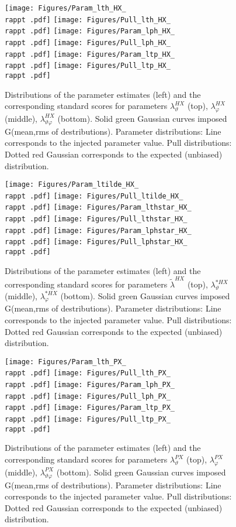 \documentclass[12pt]{article}
\newcommand{\lamthHX}{\lambda^{\scriptscriptstyle HX}_\vartheta}
\newcommand{\lamphHX}{\lambda^{\scriptscriptstyle HX}_\varphi}
\newcommand{\lamthphHX}{\lambda^{\scriptscriptstyle HX}_{\vartheta \varphi}}
\newcommand{\lamtildeHX}{\tilde{\lambda}^{\scriptscriptstyle HX}}
\newcommand{\lamthstarHX}{\lambda^{* \scriptscriptstyle HX}_\vartheta}
\newcommand{\lamphstarHX}{\lambda^{* \scriptscriptstyle HX}_\varphi}
\newcommand{\lamthPX}{\lambda^{\scriptscriptstyle PX}_\vartheta}
\newcommand{\lamphPX}{\lambda^{\scriptscriptstyle PX}_\varphi}
\newcommand{\lamthphPX}{\lambda^{\scriptscriptstyle PX}_{\vartheta \varphi}}
\providecommand{\rappt}[1]{rap1pt1}%
\begin{document}
\begin{figure}[htbp]
\centering
\texttt{[image: Figures/Param\_lth\_HX\_\\rappt .pdf]}
\texttt{[image: Figures/Pull\_lth\_HX\_\\rappt .pdf]}
\texttt{[image: Figures/Param\_lph\_HX\_\\rappt .pdf]}
\texttt{[image: Figures/Pull\_lph\_HX\_\\rappt .pdf]}
\texttt{[image: Figures/Param\_ltp\_HX\_\\rappt .pdf]}
\texttt{[image: Figures/Pull\_ltp\_HX\_\\rappt .pdf]}
\caption{Distributions of the parameter estimates (left) and the corresponding
standard scores for parameters $\lamthHX$ (top), $\lamphHX$ (middle),
$\lamthphHX$ (bottom). Solid green Gaussian curves imposed G(mean,rms of
destributions). Parameter distributions: Line corresponds to the injected parameter value.
Pull distributions: Dotted red Gaussian corresponds to the expected
(unbiased) distribution.}
\end{figure}
\clearpage

\begin{figure}[htbp]
\centering
\texttt{[image: Figures/Param\_ltilde\_HX\_\\rappt .pdf]}
\texttt{[image: Figures/Pull\_ltilde\_HX\_\\rappt .pdf]}
\texttt{[image: Figures/Param\_lthstar\_HX\_\\rappt .pdf]}
\texttt{[image: Figures/Pull\_lthstar\_HX\_\\rappt .pdf]}
\texttt{[image: Figures/Param\_lphstar\_HX\_\\rappt .pdf]}
\texttt{[image: Figures/Pull\_lphstar\_HX\_\\rappt .pdf]}
\caption{Distributions of the parameter estimates (left) and the corresponding
standard scores for parameters $\lamtildeHX$ (top), $\lamthstarHX$ (middle),
$\lamphstarHX$ (bottom). Solid green Gaussian curves imposed G(mean,rms of
destributions). Parameter distributions: Line corresponds to the injected parameter value.
Pull distributions: Dotted red Gaussian corresponds to the expected
(unbiased) distribution.}
\end{figure}
\clearpage









\begin{figure}[htbp]
\centering
\texttt{[image: Figures/Param\_lth\_PX\_\\rappt .pdf]}
\texttt{[image: Figures/Pull\_lth\_PX\_\\rappt .pdf]}
\texttt{[image: Figures/Param\_lph\_PX\_\\rappt .pdf]}
\texttt{[image: Figures/Pull\_lph\_PX\_\\rappt .pdf]}
\texttt{[image: Figures/Param\_ltp\_PX\_\\rappt .pdf]}
\texttt{[image: Figures/Pull\_ltp\_PX\_\\rappt .pdf]}
\caption{Distributions of the parameter estimates (left) and the corresponding
standard scores for parameters $\lamthPX$ (top), $\lamphPX$ (middle),
$\lamthphPX$ (bottom). Solid green Gaussian curves imposed G(mean,rms of
destributions). Parameter distributions: Line corresponds to the injected parameter value.
Pull distributions: Dotted red Gaussian corresponds to the expected
(unbiased) distribution.}
\end{figure}
\clearpage
\end{document}
